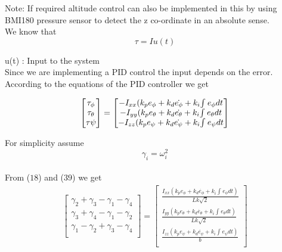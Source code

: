\documentclass[9pt]{article}
\begin{document}
\noindent Note: If required altitude control can also be implemented in this by using BMI180 pressure sensor to detect the z co-ordinate in an absolute sense.\\

\noindent We know that 
\begin{equation}
\tau = Iu(t)
\end{equation}

\noindent u(t) : Input to the system\\

\noindent Since we are implementing a PID control the input depends on the error. According to the equations of the PID controller we get

\begin{eqnarray}
\left[
\begin{matrix}
\tau_{\phi} \\
\tau_{\theta} \\
\tau{\psi} 
\end{matrix}
\right]=
\left[
\begin{matrix}
-I_{xx}(k_{p}e_{\phi} + k_{d}\dot{e_{\phi}} + k_{i}$$\int_{}^{} e_{\phi} dt$$\\
-I_{yy}(k_{p}e_{\theta} + k_{d}\dot{e_{\theta}} + k_{i}$$\int_{}^{} e_{\theta} dt$$\\
-I_{zz}(k_{p}e_{\psi} + k_{d}\dot{e_{\psi}} + k_{i}$$\int_{}^{} e_{\psi} dt$$
\end{matrix}
\right]
\end{eqnarray}

\noindent For simplicity assume
\begin{equation}
\gamma_{i}=\omega_{i}^{2}
\end{equation}
\\
\noindent From ($18$) and ($39$) we get\\

\begin{eqnarray}
\left[
\begin{matrix}
\gamma_{2} + \gamma_{3} - \gamma_{1} - \gamma_{4} \\
\gamma_{3} + \gamma_{4} - \gamma_{1} - \gamma_{2} \\
\gamma_{1} - \gamma_{2} + \gamma_{3} - \gamma_{4}\\ 
\end{matrix}
\right]=
\left[
\begin{matrix}
\frac{I_{xx}(k_{p}e_{\phi} + k_{d}\dot{e_{\phi}} + k_{i} \int_{}^{}e_{\phi}dt)}{Lk\sqrt{2}}  \\
\frac{I_{yy}(k_{p}e_{\theta} + k_{d}\dot{e_{\theta}} + k_{i} \int_{}^{}e_{\theta}dt)}{Lk\sqrt{2}} \\
\frac{I_{zz}(k_{p}e_{\psi} + k_{d}\dot{e_{\psi}} + k_{i} \int_{}^{}e_{\psi}dt)}{b} \\
\end{matrix}
\right]
\end{eqnarray}
\end{document}
